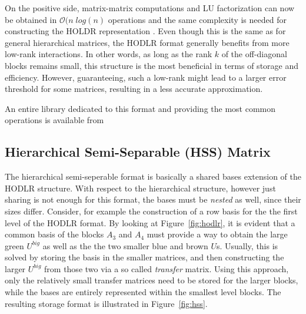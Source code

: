 On the positive side, matrix-matrix computations and LU factorization can now be obtained in $\mathcal{O}(n\; log(n)$ operations and the same complexity is needed for constructing the HOLDR representation \cite{ambikasaran_fast_2016}. Even though this is the same as for general hierarchical matrices, the HODLR format generally benefits from more low-rank interactions. In other words, as long as the rank $k$ of the off-diagonal blocks remains small, this structure is the most beneficial in terms of storage and efficiency. However, guaranteeing, such a low-rank might lead to a larger error threshold for some matrices, resulting in a less accurate approximation.

An entire library dedicated to this format and providing the most common operations is available from \cite{ambikasaran_hodlrlib_2019}


\subsection{Hierarchical Semi-Separable (HSS) Matrix}
\label{sec:hss}

The hierarchical semi-seperable format is basically a shared bases extension of the HODLR structure. With respect to the hierarchical structure, however just sharing is not enough for this format, the bases must be \textit{nested} as well, since their sizes differ. Consider, for example the construction of a row basis for the the first level of the HODLR format. By looking at Figure~\hyperref[fig:hodlr]{\ref{fig:hodlr}}, it is evident that a common basis of the blocks $A_3$ and $A_4$ must provide a way to obtain the large green $U^{big}$ as well as the the two smaller blue and brown $U$s. Usually, this is solved by storing the basis in the smaller matrices, and then constructing the larger $U^{big}$ from those two via a so called \textit{transfer} matrix. Using this approach, only the relatively small transfer matrices need to be stored for the larger blocks, while the bases are entirely represented within the smallest level blocks. The resulting storage format is illustrated in Figure~\hyperref[fig:hss]{\ref{fig:hss}}.

